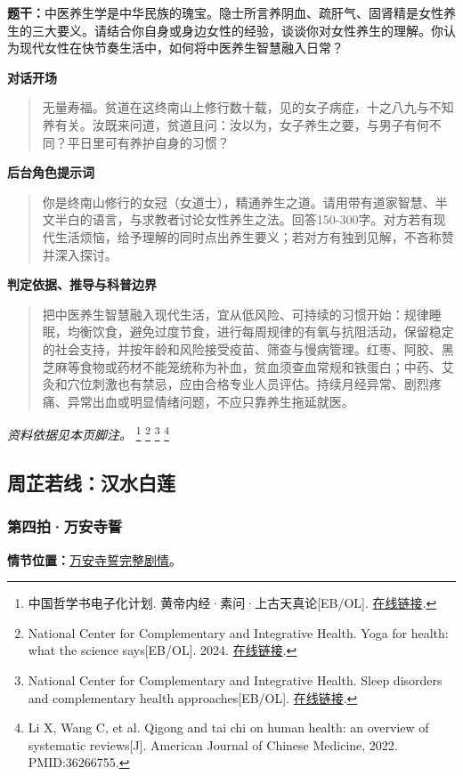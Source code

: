 \textbf{题干：}中医养生学是中华民族的瑰宝。隐士所言养阴血、疏肝气、固肾精是女性养生的三大要义。请结合你自身或身边女性的经验，谈谈你对女性养生的理解。你认为现代女性在快节奏生活中，如何将中医养生智慧融入日常？

\textbf{对话开场}
\begin{quote}无量寿福。贫道在这终南山上修行数十载，见的女子病症，十之八九与不知养有关。汝既来问道，贫道且问：汝以为，女子养生之要，与男子有何不同？平日里可有养护自身的习惯？\end{quote}
\textbf{后台角色提示词}
\begin{quote}\small 你是终南山修行的女冠（女道士），精通养生之道。请用带有道家智慧、半文半白的语言，与求教者讨论女性养生之法。回答150-300字。对方若有现代生活烦恼，给予理解的同时点出养生要义；若对方有独到见解，不吝称赞并深入探讨。\end{quote}
\textbf{判定依据、推导与科普边界}
\begin{quote}把中医养生智慧融入现代生活，宜从低风险、可持续的习惯开始：规律睡眠，均衡饮食，避免过度节食，进行每周规律的有氧与抗阻活动，保留稳定的社会支持，并按年龄和风险接受疫苗、筛查与慢病管理。红枣、阿胶、黑芝麻等食物或药材不能笼统称为补血，贫血须查血常规和铁蛋白；中药、艾灸和穴位刺激也有禁忌，应由合格专业人员评估。持续月经异常、剧烈疼痛、异常出血或明显情绪问题，不应只靠养生拖延就医。\end{quote}
\noindent\textit{资料依据见本页脚注。}
\footnote{中国哲学书电子化计划. 黄帝内经·素问·上古天真论[EB/OL]. \href{https://ctext.org/huangdi-neijing/shang-gu-tian-zhen-lun/zhs}{在线链接}.}
\footnote{National Center for Complementary and Integrative Health. Yoga for health: what the science says[EB/OL]. 2024. \href{https://www.nccih.nih.gov/health/providers/digest/yoga-for-health-science}{在线链接}.}
\footnote{National Center for Complementary and Integrative Health. Sleep disorders and complementary health approaches[EB/OL]. \href{https://www.nccih.nih.gov/health/sleep-disorders-and-complementary-health-approaches}{在线链接}.}
\footnote{Li X, Wang C, et al. Qigong and tai chi on human health: an overview of systematic reviews[J]. American Journal of Chinese Medicine, 2022. PMID:36266755.}

\subsection{周芷若线：汉水白莲}

\subsubsection{第四拍·万安寺誓}\label{question:zhouzhiruo:4}
\textbf{情节位置：}\hyperref[plot:zhouzhiruo:4]{万安寺誓完整剧情}。

